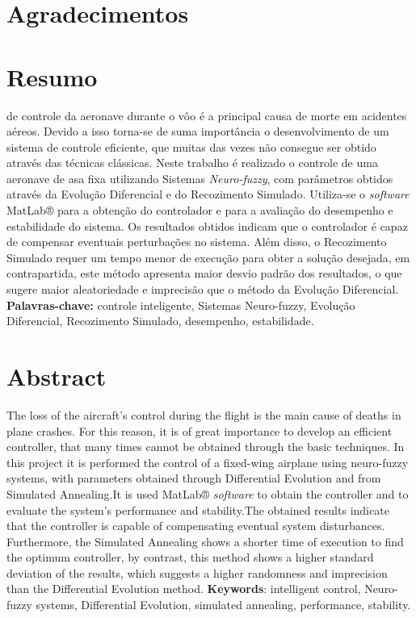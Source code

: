 \documentclass[10pt,a4paper]{article}
\numberwithin{equation}{section}
\begin{document}
 
\section*{Agradecimentos}

\par 

\newpage

\section*{Resumo}
\par  de controle da aeronave durante o vôo é a principal causa de morte em acidentes aéreos. Devido a isso torna-se de suma importância o desenvolvimento de um sistema de controle eficiente, que muitas das vezes não consegue ser obtido através das técnicas clássicas. Neste trabalho é realizado o controle de uma aeronave de asa fixa utilizando Sistemas \textit{Neuro-fuzzy}, com parâmetros obtidos através da Evolução Diferencial e do Recozimento Simulado. Utiliza-se o \textit{software} MatLab® para a obtenção do controlador e para a avaliação do desempenho e estabilidade do sistema. Os resultados obtidos indicam que o controlador é capaz de compensar eventuais perturbações no sistema. Além disso, o Recozimento Simulado requer um tempo menor de execução para obter a solução desejada, em contrapartida, este método apresenta maior desvio padrão dos resultados, o que sugere maior aleatoriedade e imprecisão que o método da Evolução Diferencial.
\newline
\newline
\newline
\textbf{Palavras-chave:} controle inteligente, Sistemas Neuro-fuzzy, Evolução Diferencial, Recozimento Simulado, desempenho, estabilidade.

\newpage
\section*{Abstract}
\par The loss of the aircraft’s control during the flight is the main cause of deaths in plane crashes. For this reason, it is of great importance to develop an efficient controller, that many times cannot be obtained through the basic techniques. In this project it is performed the control of a fixed-wing airplane using neuro-fuzzy systems, with parameters obtained through Differential Evolution and from Simulated Annealing.It is used MatLab® \textit{software} to obtain the controller and to evaluate the system’s performance and stability.The obtained results indicate that the controller is capable of compensating eventual system disturbances. Furthermore, the Simulated Annealing shows a shorter time of execution to find the optimum controller, by contrast, this method shows a higher standard deviation of the results, which suggests a higher randomness and imprecision than the Differential Evolution method.
\newline
\newline
\newline
\textbf{Keywords}: intelligent control, Neuro-fuzzy systems, Differential Evolution, simulated annealing, performance, stability.
\newpage
\listoffigures
\newpage
\listoftables
\newpage
\end{document}
